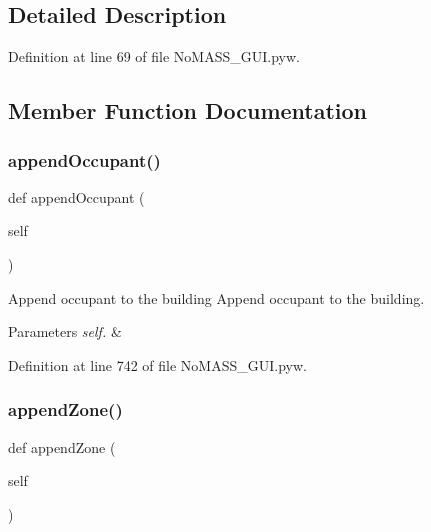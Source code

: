 \subsection{Detailed Description}


Definition at line 69 of file No\+M\+A\+S\+S\+\_\+\+G\+U\+I.\+pyw.



\subsection{Member Function Documentation}
\mbox{\label{class_no_m_a_s_s___g_u_i_1_1_app_a673849f77e1dc7b5f6ada8645b651f97}} 
\subsubsection{\texorpdfstring{append\+Occupant()}{appendOccupant()}}
{\footnotesize\ttfamily def append\+Occupant (\begin{DoxyParamCaption}\item[{}]{self }\end{DoxyParamCaption})}



Append occupant to the building Append occupant to the building. 


\begin{DoxyParams}{Parameters}
{\em self.} & \\
\hline
\end{DoxyParams}


Definition at line 742 of file No\+M\+A\+S\+S\+\_\+\+G\+U\+I.\+pyw.

\mbox{\label{class_no_m_a_s_s___g_u_i_1_1_app_ac2d16e447b5b9993ed91579a3285deff}} 
\subsubsection{\texorpdfstring{append\+Zone()}{appendZone()}}
{\footnotesize\ttfamily def append\+Zone (\begin{DoxyParamCaption}\item[{}]{self }\end{DoxyParamCaption})}



